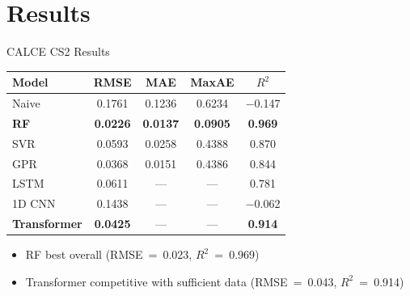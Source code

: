 \documentclass[aspectratio=169,11pt]{beamer}
\begin{document}
\section{Results}

\begin{frame}{CALCE CS2 Results}
\begin{table}[H]
\centering
\small
\begin{tabular}{lcccc}
\toprule
\textbf{Model} & \textbf{RMSE} & \textbf{MAE} & \textbf{MaxAE} & \textbf{$R^2$} \\
\midrule
Naive & 0.1761 & 0.1236 & 0.6234 & $-$0.147 \\
\textbf{RF} & \textbf{0.0226} & \textbf{0.0137} & \textbf{0.0905} & \textbf{0.969} \\
SVR & 0.0593 & 0.0258 & 0.4388 & 0.870 \\
GPR & 0.0368 & 0.0151 & 0.4386 & 0.844 \\
\midrule
LSTM & 0.0611 & --- & --- & 0.781 \\
1D CNN & 0.1438 & --- & --- & $-$0.062 \\
\textbf{Transformer} & \textbf{0.0425} & --- & --- & \textbf{0.914} \\
\bottomrule
\end{tabular}
\end{table}
\vspace{-0.5em}
\begin{itemize}[nosep,small]
    \item RF best overall (RMSE~=~0.023, $R^2$~=~0.969)
    \item Transformer competitive with sufficient data (RMSE~=~0.043, $R^2$~=~0.914)
\end{itemize}
\end{frame}
\end{document}
